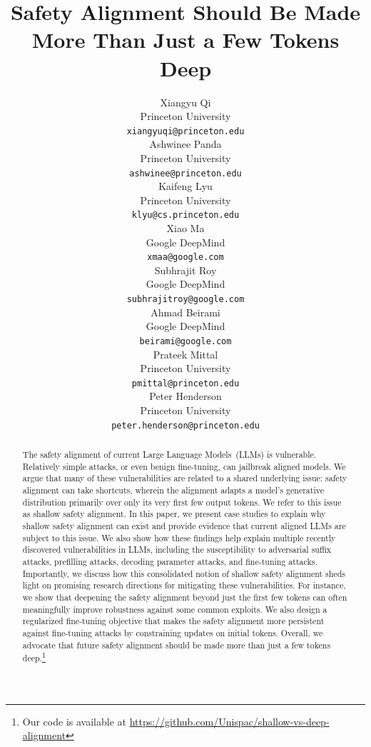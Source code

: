 \documentclass{article}
\title{Safety Alignment Should Be Made\\More Than Just a Few Tokens Deep}
\author{
  Xiangyu Qi\\
  Princeton University\\
  \texttt{xiangyuqi@princeton.edu} \\
  \And
  Ashwinee Panda\\
  Princeton University\\
  \texttt{ashwinee@princeton.edu} \\
  \And
  Kaifeng Lyu\\
  Princeton University\\
  \texttt{klyu@cs.princeton.edu} \\
  \And
  Xiao Ma\\
  Google DeepMind\\
  \texttt{xmaa@google.com} \\
  \And
  Subhrajit Roy\\
  Google DeepMind\\
  \texttt{subhrajitroy@google.com} \\
  \And
  Ahmad Beirami\\
  Google DeepMind\\
  \texttt{beirami@google.com} \\
  \And
  Prateek Mittal\\
  Princeton University\\
  \texttt{pmittal@princeton.edu}\\
  \And
  Peter Henderson\\
  Princeton University\\
  \texttt{peter.henderson@princeton.edu}
}
\begin{document}
\maketitle


\begin{abstract}
The safety alignment of current Large Language Models~(LLMs) is vulnerable. Relatively simple attacks, or even benign fine-tuning, can jailbreak aligned models. We argue that many of these vulnerabilities are related to a shared underlying issue: safety alignment can take shortcuts, wherein the alignment adapts a model's generative distribution primarily over only its very first few output tokens.
We refer to this issue as {shallow safety alignment}. In this paper, we present case studies to explain why shallow safety alignment can exist and provide evidence that current aligned LLMs are subject to this issue. We also show how these findings help explain multiple recently discovered vulnerabilities in LLMs, including the susceptibility to adversarial suffix attacks, prefilling attacks, decoding parameter attacks, and fine-tuning attacks. Importantly, we discuss how this consolidated notion of shallow safety alignment sheds light on promising research directions for mitigating these vulnerabilities. For instance, we show that deepening the safety alignment beyond just the first few tokens can often meaningfully improve robustness against some common exploits. We also design a regularized fine-tuning objective that makes the safety alignment more persistent against fine-tuning attacks by constraining updates on initial tokens.
Overall, we advocate that future safety alignment should be made more than just a few tokens deep.\footnote{Our code is available at \url{https://github.com/Unispac/shallow-vs-deep-alignment}}
\end{abstract}






% 






% 


%





\end{document}
